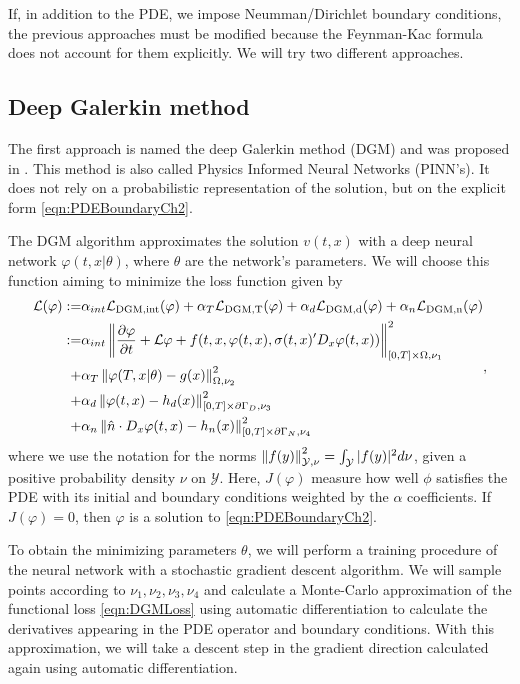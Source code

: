 If, in addition to the PDE, we impose Neumman/Dirichlet boundary conditions, the previous approaches must be modified because the Feynman-Kac formula does not account for them explicitly. We will try two different approaches.
\subsection{Deep Galerkin method}
The first approach is named the deep Galerkin method (DGM) and was proposed in \cite{sirignano_dgm_2018}. This method is also called Physics Informed Neural Networks (PINN's). It does not rely on a probabilistic representation of the solution, but on the explicit form \eqref{eqn:PDEBoundaryCh2}.

The DGM algorithm approximates the solution $v(t,x)$ with a deep neural network $\varphi(t,x|\theta)$, where $\theta$ are the network's parameters. We will choose this function aiming to minimize the loss function given by
\begin{equation}
	\label{eqn:DGMLoss}
	\begin{split}
			\mathcal{L}(\varphi):=&\alpha_{int}\mathcal{L}_{\text{DGM,int}}(\varphi)+\alpha_{T}\mathcal{L}_{\text{DGM,T}}(\varphi)+\alpha_{d}\mathcal{L}_{\text{DGM,d}}(\varphi)+\alpha_{n}\mathcal{L}_{\text{DGM,n}}(\varphi) \\
			:=&\alpha_{int}\left\lVert\frac{\partial \varphi}{\partial t}+\mathcal{L}\varphi+f(t,x,\varphi(t,x),\sigma(t,x)'D_x \varphi(t,x))\right\rVert_{[0,T]\times \Omega,\nu_1}^2\\
			+&\alpha_{T}\left\lVert\varphi(T,x|\theta)-g(x)\right\rVert_{\Omega,\nu_2}^2\\
			+&\alpha_{d}\left\lVert\varphi(t,x)-h_d(x)\right\rVert_{[0,T]\times \partial \Gamma_D,\nu_3 }^2\\
			+&\alpha_{n}\left\lVert\hat{n}\cdot D_x \varphi(t,x)-h_n(x)\right\rVert_{[0,T]\times \partial \Gamma_N,\nu_4 }^2
	\end{split},
\end{equation}
where we use the notation for the norms $\left\lVert f(y)\right\rVert_{\mathcal{Y},\nu}^2=\int_{\mathcal{Y}}|f(y)|^2d\nu$, given a positive probability density $\nu$ on $\mathcal{Y}$. Here, $J(\varphi)$ measure how well $\phi$ satisfies the PDE with its initial and boundary conditions weighted by the $\alpha$ coefficients. If $J(\varphi)=0$, then $\varphi$ is a solution to \eqref{eqn:PDEBoundaryCh2}.

To obtain the minimizing parameters $\theta$, we will perform a training procedure of the neural network with a stochastic gradient descent algorithm. We will sample points according to $\nu_1,\nu_2,\nu_3,\nu_4$ and calculate a Monte-Carlo approximation of the functional loss \eqref{eqn:DGMLoss} using automatic differentiation to calculate the derivatives appearing in the PDE operator and boundary conditions. With this approximation, we will take a descent step in the gradient direction calculated again using automatic differentiation. 


